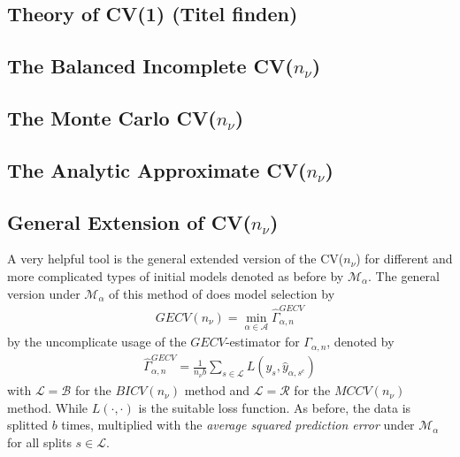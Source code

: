 \documentclass[Research_Module_ES.tex]{subfiles}
\begin{document}
\subsection{Theory of CV(1) (Titel finden)}

\subsection{The Balanced Incomplete CV($n_\nu$)}

\subsection{The Monte Carlo CV($n_\nu$)}

\subsection{The Analytic Approximate CV($n_\nu$)}

\subsection{General Extension of CV($n_\nu$)}
A very helpful tool is the general extended version of the CV($n_\nu$) for different and more complicated types of initial models denoted as before by $\mathcal{M}_\alpha$. The general version under $\mathcal{M}_\alpha$ of this method of \cite{shao} does model selection by 
\begin{align*}
	GECV(n_\nu)=\min_{\alpha\in\mathcal{A}}\hat{\Gamma}_{\alpha,n}^{GECV}
\end{align*}
by the uncomplicate usage of the $GECV$-estimator for $\Gamma_{\alpha,n}$, denoted by
\begin{align*}
	\hat{\Gamma}_{\alpha,n}^{GECV}=\frac{1}{n_\nu b}\sum_{s\in\mathcal{L}}L(y_s,\hat{y}_{\alpha,s^c})
\end{align*} 
with $\mathcal{L}=\mathcal{B}$ for the $BICV(n_\nu)$ method and $\mathcal{L}=\mathcal{R}$ for the $MCCV(n_\nu)$ method. While $L(\cdot,\cdot)$ is the suitable loss function. As before, the data is splitted $b$ times, multiplied with the \textit{average squared prediction error} under $\mathcal{M}_\alpha$ for all splits $s\in\mathcal{L}$.
\end{document}
